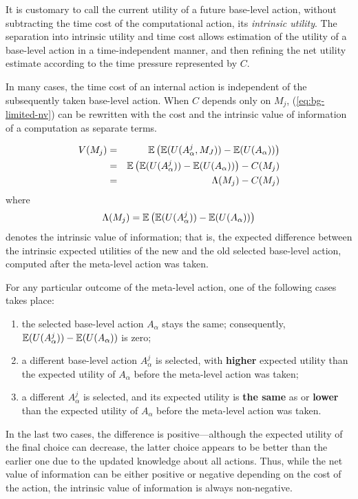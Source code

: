 It is customary to call the current utility of a future base-level
action, without subtracting the time cost of the computational action,
its {\em intrinsic utility}. The separation into intrinsic
utility and time cost allows estimation of the utility of a base-level
action in a time-independent manner, and then refining the net utility
estimate according to the time pressure represented by $C$.

In many cases, the time cost of an internal action is independent of
the subsequently taken base-level action. When $C$ depends only on
$M_j$, (\ref{eq:bg-limited-nv}) can be rewritten with the cost and the
intrinsic value of information of a computation as separate terms.

\begin{eqnarray}
\label{eq:bg-limited-v=bc}
V(M_j)&=&\mathbb{E}\left(\mathbb{E}(U(A_\alpha^j, M_J))-\mathbb{E}(U(A_\alpha))\right)\nonumber\\
     &=&\mathbb{E}\left(\mathbb{E}(U(A_\alpha^j))-\mathbb{E}(U(A_\alpha))\right)-C(M_j)\\
     &=& \Lambda(M_j)-C(M_j)
\end{eqnarray}
where
\begin{equation}
\label{eq:bg-limited-benefit}
\Lambda(M_j)=\mathbb{E}\left(\mathbb{E}(U(A_\alpha^j))-\mathbb{E}(U(A_\alpha))\right)
\end{equation}
denotes the intrinsic value of information; that is, the expected
difference between the intrinsic expected utilities of the new
and the old selected base-level action, computed after the meta-level
action was taken.

For any particular outcome of the meta-level action, one of the
following cases takes place:

\begin{enumerate}
\item the selected base-level action $A_\alpha$ stays the same;
  consequently, $\mathbb{E}(U(A_\alpha^j))-\mathbb{E}(U(A_\alpha))$ is zero;
\item a different base-level action $A_\alpha^j$ is selected, with
  {\bf higher} expected utility than the expected utility of
  $A_\alpha$ before the meta-level action was taken;
\item a different $A_\alpha^j$ is selected, and its expected
  utility is {\bf the same} as or {\bf lower} than the expected
  utility of $A_\alpha$ before the meta-level action was taken.
\end{enumerate}

In the last two cases, the difference is positive---although the
expected utility of the final choice can decrease, the latter
choice appears to be better than the earlier one due
to the updated knowledge about all actions. Thus, while the
net value of information can be either positive or negative depending on
the cost of the action, the intrinsic value of information is always
non-negative.

